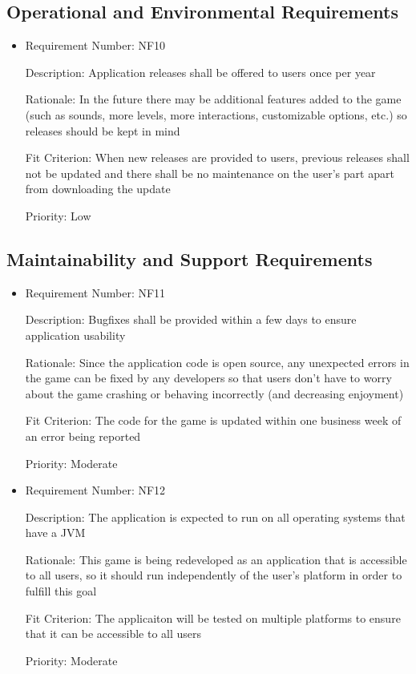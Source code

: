 \documentclass[12pt, titlepage]{article}
\begin{document}
\subsection{Operational and Environmental Requirements}
\begin{itemize}
	\item
	Requirement Number: NF10

	Description: Application releases shall be offered to users once per year

	Rationale: In the future there may be additional features added to the game (such as sounds, more levels, more interactions, customizable options, etc.) so releases should be kept in mind

	Fit Criterion: When new releases are provided to users, previous releases shall not be updated and there shall be no maintenance on the user's part apart from downloading the update

	Priority: Low

\end{itemize}

\subsection{Maintainability and Support Requirements}
\begin{itemize}
	\item
	Requirement Number: NF11

	Description: Bugfixes shall be provided within a few days to ensure application usability

	Rationale: Since the application code is open source, any unexpected errors in the game can be fixed by any developers so that users don't have to worry about the game crashing or behaving incorrectly (and decreasing enjoyment)

	Fit Criterion: The code for the game is updated within one business week of an error being reported

	Priority: Moderate

	\item
	Requirement Number: NF12

	Description: The application is expected to run on all operating systems that have a JVM

	Rationale: This game is being redeveloped as an application that is accessible to all users, so it should run independently of the user's platform in order to fulfill this goal

	Fit Criterion: The applicaiton will be tested on multiple platforms to ensure that it can be accessible to all users

	Priority: Moderate
\end{itemize}
\end{document}
